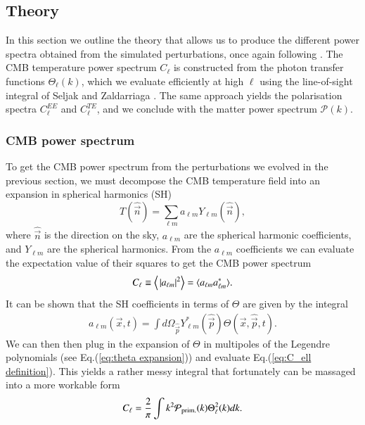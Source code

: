 \documentclass[twocolumn]{aa}
\begin{document}
\subsection{Theory}
In this section we outline the theory that allows us to produce the different power spectra obtained from the simulated perturbations, once again following \cite{winther_lectures,winther_milestone4}. The CMB temperature power spectrum $C_\ell$ is constructed from the photon transfer functions $\Theta_\ell(k)$, which we evaluate efficiently at high $\ell$ using the line-of-sight integral of Seljak and Zaldarriaga \citep{LOS_integration}. The same approach yields the polarisation spectra $C_\ell^{EE}$ and $C_\ell^{TE}$, and we conclude with the matter power spectrum $\mathcal{P}(k)$.

\subsubsection{CMB power spectrum}
To get the CMB power spectrum from the perturbations we evolved in the previous section, we must decompose the CMB temperature field into an expansion in spherical harmonics (SH)
\begin{equation*}
      T(\hat{\vec{n}}) = \sum_{\ell m} a_{\ell m} Y_{\ell m}(\hat{\vec{n}}),
\end{equation*}
where $\hat{\vec{n}}$ is the direction on the sky, $a_{\ell m}$ are the spherical harmonic coefficients, and $Y_{\ell m}$ are the spherical harmonics. From the $a_{\ell m}$ coefficients we can evaluate the expectation value of their squares to get the CMB power spectrum
\begin{equation}
      C_\ell \equiv \Big\langle \hspace{0.5mm}{|a_{\ell m}|^2}\Big\rangle  =  \langle a_{\ell m}a_{\ell m}^*\rangle.
      \label{eq:C_ell definition}
\end{equation}
It can be shown that the SH coefficients in terms of $\Theta$ are given by the integral
\begin{align*}
      a_{\ell m}(\vec{x},t) = \int d\Omega_{\hat{\vec{p}}} Y_{\ell m}^*(\hat{\vec{p}})\Theta(\vec{x},\hat{\vec{p}},t).
\end{align*}
We can then then plug in the expansion of $\Theta$ in multipoles of the Legendre polynomials (see Eq.(\ref{eq:theta expansion})) and evaluate Eq.(\ref{eq:C_ell definition}). This yields a rather messy integral that fortunately can be massaged into a more workable form
\begin{align*}
      C_\ell = \frac{2}{\pi}\int k^2\mathcal{P}_{\rm prim.}(k) \Theta_\ell^2(k)dk.
\end{align*}
\end{document}
